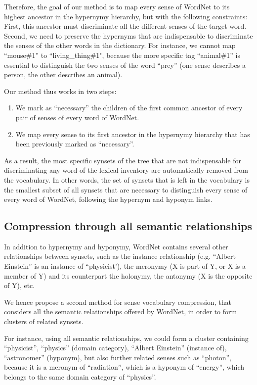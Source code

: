 \documentclass[11pt]{article}
\begin{document}
Therefore, the goal of our method is to map every sense of WordNet to its highest ancestor in the hypernymy hierarchy, but with the following constraints:
First, this ancestor must discriminate all the different senses of the target word.
Second, we need to preserve the hypernyms that are indispensable to discriminate the senses of the other words in the dictionary. For instance, we cannot map ``mouse\#1'' to ``living\_thing\#1", because the more specific tag ``animal\#1'' is essential to distinguish the two senses of the word ``prey'' (one sense describes a person, the other describes an animal).

\noindent Our method thus works in two steps:
\begin{enumerate}[leftmargin=*,topsep=0pt,itemsep=0pt,parsep=0pt,partopsep=0pt]
    \item We mark as ``necessary'' the children of the first common ancestor of every pair of senses of every word of WordNet.
    \item We map every sense to its first ancestor in the hypernymy hierarchy that has been previously marked as ``necessary''.
\end{enumerate}

\noindent As a result, the most specific synsets of the tree that are not indispensable for discriminating any word of the lexical inventory are automatically removed from the vocabulary. In other words, the set of synsets that is left in the vocabulary is the smallest subset of all synsets that are necessary to distinguish every sense of every word of WordNet, following the hypernym and hyponym links.

\subsection{Compression through all semantic relationships}

In addition to hypernymy and hyponymy, WordNet contains several other relationships between synsets, such as the instance relationship (e.g. ``Albert Einstein'' is an instance of ``physicist'), the meronymy (X is part of Y, or X is a member of Y) and its counterpart the holonymy, the antonymy (X is the opposite of Y), etc.

We hence propose a second method for sense vocabulary compression, that considers all the semantic relationships offered by WordNet, in order to form clusters of related synsets.


For instance, using all semantic relationships, we could form a cluster containing ``physicist'', ``physics'' (domain category), ``Albert Einstein'' (instance of), ``astronomer'' (hyponym), but also further related senses such as ``photon'', because it is a meronym of ``radiation'', which is a hyponym of ``energy'', which belongs to the same domain category of ``physics''.  
\end{document}
